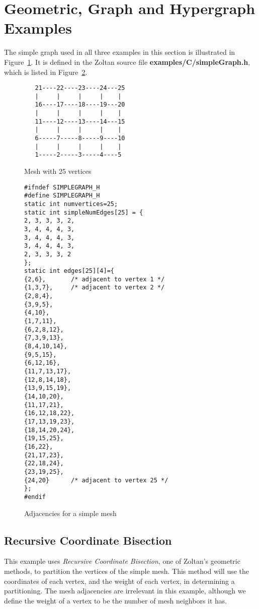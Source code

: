 \clearpage
\section{Geometric, Graph and Hypergraph Examples}

The simple graph used in all three examples in this section
is illustrated in Figure~\ref{fig:mesh25}.
It is defined in the Zoltan source file \textbf{examples/C/simpleGraph.h},
which is listed in Figure~\ref{fig:simpleGraphDotH}.

\begin{figure}[bottom]
\label{fig:mesh25}
\begin{center}
\begin{verbatim}
   21----22----23----24---25
   |     |     |     |    |
   16----17----18----19---20
   |     |     |     |    |
   11----12----13----14---15
   |     |     |     |    |
   6-----7-----8-----9----10
   |     |     |     |    |
   1-----2-----3-----4----5
\end{verbatim}
\caption{Mesh with 25 vertices}
\end{center}
\end{figure}

\begin{figure}
\label{fig:simpleGraphDotH}
\begin{flushleft}
\begin{verbatim}
#ifndef SIMPLEGRAPH_H
#define SIMPLEGRAPH_H
static int numvertices=25;
static int simpleNumEdges[25] = {
2, 3, 3, 3, 2,
3, 4, 4, 4, 3,
3, 4, 4, 4, 3,
3, 4, 4, 4, 3,
2, 3, 3, 3, 2
};
static int edges[25][4]={
{2,6},       /* adjacent to vertex 1 */
{1,3,7},     /* adjacent to vertex 2 */
{2,8,4},
{3,9,5},
{4,10},
{1,7,11},
{6,2,8,12},
{7,3,9,13},
{8,4,10,14},
{9,5,15},
{6,12,16},
{11,7,13,17},
{12,8,14,18},
{13,9,15,19},
{14,10,20},
{11,17,21},
{16,12,18,22},
{17,13,19,23},
{18,14,20,24},
{19,15,25},
{16,22},
{21,17,23},
{22,18,24},
{23,19,25},
{24,20}      /* adjacent to vertex 25 */
};
#endif
\end{verbatim}
\end{flushleft}
\caption{Adjacencies for a simple mesh}
\end{figure}


\clearpage
\subsection{Recursive Coordinate Bisection}
\label{sec:rcb}

This example uses \emph{Recursive Coordinate Bisection}, 
one of Zoltan's geometric methods, to partition
the vertices of the simple mesh.  This method will use
the coordinates of each vertex, and the weight of each
vertex, in determining a partitioning.  The mesh adjacencies are
irrelevant in this example, although we define the weight of
a vertex to be the number of mesh neighbors it has.

